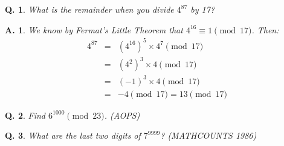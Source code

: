 \documentclass{article}
\newtheorem{question}{Q.}
\newtheorem{answer}{A.}
\begin{document}
\begin{question}
	What is the remainder when you divide $4^{87}$ by 17?
\end{question}
\begin{answer}
	We know by Fermat's Little Theorem that $4^{16} \equiv 1 \pmod{17}$.
	Then:
	\begin{eqnarray*}
		4^{87} &=& (4^{16})^5 \times 4^7 \pmod{17} \\
		&=& (4^2)^3 \times 4 \pmod{17} \\
		&=& (-1)^3 \times 4 \pmod{17} \\
		&=& -4 \pmod{17} = 13 \pmod{17}
	\end{eqnarray*}
\end{answer}

\begin{question}Find $6^{1000} \pmod{23}$. (AOPS)\end{question}
\vspace*{\bigskipamount}

\begin{question}What are the last two digits of $7^{9999}$? (MATHCOUNTS 1986)\end{question}
\vspace*{\bigskipamount}
\end{document}
